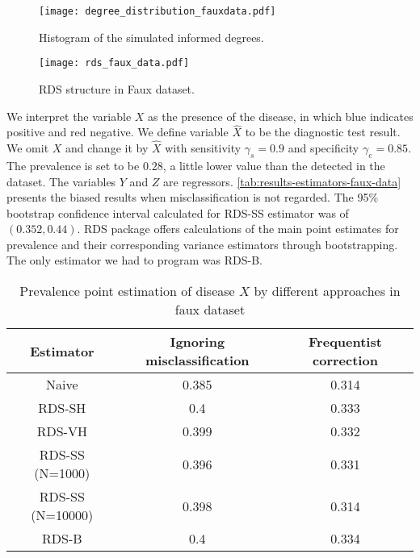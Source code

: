 \begin{figure}[htbp]
    \centering
    \caption{\label{fig:degre_distribution_fauxdata}Histogram of the simulated 
    informed degrees.}
    \texttt{[image: degree\_distribution\_fauxdata.pdf]}
\end{figure}

\begin{figure}[htb]
    \centering
    \caption{\label{fig:rds_faux_data}RDS structure in 
      Faux dataset.}
    \texttt{[image: rds\_faux\_data.pdf]}
  \end{figure}

We interpret the variable $X$ as the presence of the disease, in
which blue indicates positive and red negative. We define variable $\hat{X}$
to be the diagnostic test result. We omit $X$ and change it by $\hat{X}$ with sensitivity $\gamma_s = 0.9$ and specificity $\gamma_e =
0.85$. The prevalence is set to be $0.28$, a little
lower value than the detected in the dataset. The variables $Y$ and $Z$ are
regressors. \autoref{tab:results-estimators-faux-data} presents the biased
results when misclassification is not regarded. The 95\% bootstrap confidence interval
calculated for RDS-SS estimator was of $(0.352, 0.44)$. RDS package offers
calculations of the main point estimates for prevalence and their corresponding
variance estimators through bootstrapping. The only estimator we had to
program was RDS-B.

\begin{table}[htb]
    \centering
    \caption{\label{tab:results-estimators-faux-data}Prevalence point estimation of
    disease $X$ by different approaches in faux dataset}
    \begin{tabular}{ccc}
    \hline
    Estimator & Ignoring misclassification & Frequentist correction \\ \hline
    Naive & 0.385 & 0.314 \\
    RDS-SH & 0.4 & 0.333 \\
    RDS-VH & 0.399 & 0.332 \\
    RDS-SS (N=1000) & 0.396 & 0.331 \\
    RDS-SS (N=10000) & 0.398 & 0.314 \\
    RDS-B & 0.4 & 0.334 \\ \hline
    \end{tabular}
\end{table}

